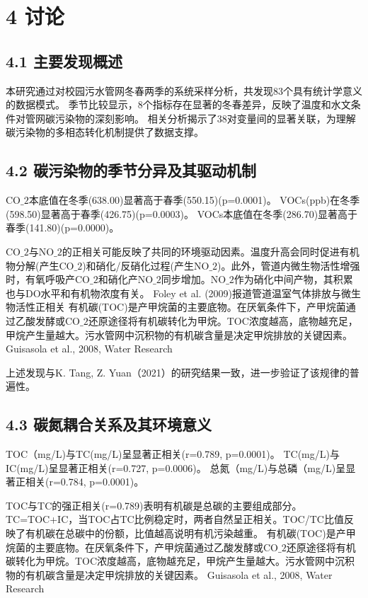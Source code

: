 \documentclass[12pt]{article}
\begin{document}
\section{4 讨论}

\subsection{4.1 主要发现概述}

本研究通过对校园污水管网冬春两季的系统采样分析，共发现83个具有统计学意义的数据模式。
季节比较显示，8个指标存在显著的冬春差异，反映了温度和水文条件对管网碳污染物的深刻影响。
相关分析揭示了38对变量间的显著关联，为理解碳污染物的多相态转化机制提供了数据支撑。

\subsection{4.2 碳污染物的季节分异及其驱动机制}

CO$\_2$本底值在冬季(638.00)显著高于春季(550.15)(p=0.0001)。
VOCs(ppb)在冬季(598.50)显著高于春季(426.75)(p=0.0003)。
VOCs本底值在冬季(286.70)显著高于春季(141.80)(p=0.0000)。

CO$\_2$与NO$\_2$的正相关可能反映了共同的环境驱动因素。温度升高会同时促进有机物分解(产生CO$\_2$)和硝化/反硝化过程(产生NO$\_2$)。此外，管道内微生物活性增强时，有氧呼吸产CO$\_2$和硝化产NO$\_2$同步增加。NO$\_2$作为硝化中间产物，其积累也与DO水平和有机物浓度有关。
Foley et al. (2009)报道管道温室气体排放与微生物活性正相关
有机碳(TOC)是产甲烷菌的主要底物。在厌氧条件下，产甲烷菌通过乙酸发酵或CO$\_2$还原途径将有机碳转化为甲烷。TOC浓度越高，底物越充足，甲烷产生量越大。污水管网中沉积物的有机碳含量是决定甲烷排放的关键因素。
Guisasola et al., 2008, Water Research

上述发现与K. Tang, Z. Yuan（2021）的研究结果一致，进一步验证了该规律的普遍性。

\subsection{4.3 碳氮耦合关系及其环境意义}

TOC（mg/L)与TC(mg/L)呈显著正相关(r=0.789, p=0.0001)。
TC(mg/L)与IC(mg/L)呈显著正相关(r=0.727, p=0.0006)。
总氮（mg/L)与总磷（mg/L)呈显著正相关(r=0.784, p=0.0001)。

TOC与TC的强正相关(r=0.789)表明有机碳是总碳的主要组成部分。TC=TOC+IC，当TOC占TC比例稳定时，两者自然呈正相关。TOC/TC比值反映了有机碳在总碳中的份额，比值越高说明有机污染越重。
有机碳(TOC)是产甲烷菌的主要底物。在厌氧条件下，产甲烷菌通过乙酸发酵或CO$\_2$还原途径将有机碳转化为甲烷。TOC浓度越高，底物越充足，甲烷产生量越大。污水管网中沉积物的有机碳含量是决定甲烷排放的关键因素。
Guisasola et al., 2008, Water Research
\end{document}

